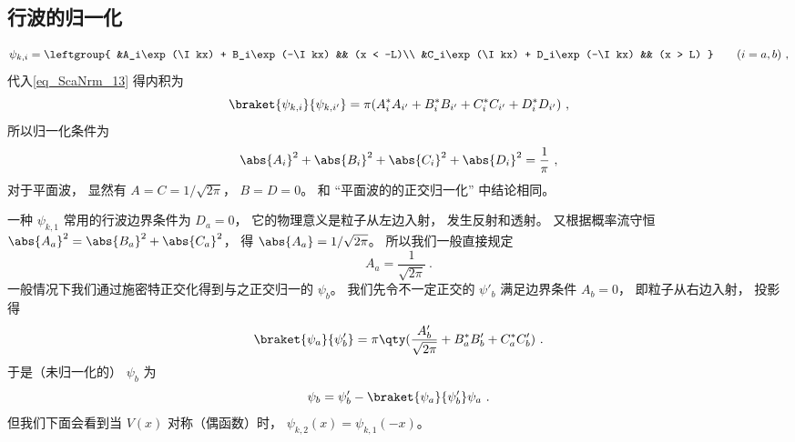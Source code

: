\subsection{行波的归一化}

\begin{equation}
\psi_{k,i} = \leftgroup{
    &A_i\exp(\I kx) + B_i\exp(-\I kx) && (x < -L)\\
    &C_i\exp(\I kx) + D_i\exp(-\I kx) && (x > L)
} \qquad (i = a,b)~,
\end{equation}
代入\autoref{eq_ScaNrm_13} 得内积为
\begin{equation}
\braket{\psi_{k,i}}{\psi_{k,i'}} = \pi (A_i^* A_{i'} + B_i^* B_{i'} + C_i^* C_{i'} + D_i^* D_{i'})~,
\end{equation}
所以归一化条件为
\begin{equation}
\abs{A_i}^2 + \abs{B_i}^2 + \abs{C_i}^2 + \abs{D_i}^2= \frac{1}{\pi}~,
\end{equation}
对于平面波， 显然有 $A = C = 1/\sqrt{2\pi}$， $B = D = 0$。 和 “平面波的的正交归一化” 中结论相同。

一种 $\psi_{k,1}$ 常用的行波边界条件为 $D_a = 0$， 它的物理意义是粒子从左边入射， 发生反射和透射。 又根据概率流守恒 $\abs{A_a}^2 = \abs{B_a}^2 + \abs{C_a}^2$， 得 $\abs{A_a} = 1/\sqrt{2\pi}$。 所以我们一般直接规定
\begin{equation}\label{eq_ScaNrm_10}
A_a = \frac{1}{\sqrt{2\pi}}~.
\end{equation}
一般情况下我们通过施密特正交化得到与之正交归一的 $\psi_b$。 我们先令不一定正交的 $\psi'_b$ 满足边界条件 $A_b = 0$， 即粒子从右边入射， 投影得
\begin{equation}
\braket{\psi_a}{\psi'_b} = \pi \qty(\frac{A'_b}{\sqrt{2\pi}} + B_a^* B'_b + C_a^*C'_b)~.
\end{equation}
于是（未归一化的） $\psi_b$ 为
\begin{equation}
\psi_b = \psi'_b - \braket{\psi_a}{\psi'_b}\psi_a~.
\end{equation}
但我们下面会看到当 $V(x)$ 对称（偶函数）时， $\psi_{k,2}(x) = \psi_{k,1}(-x)$。

